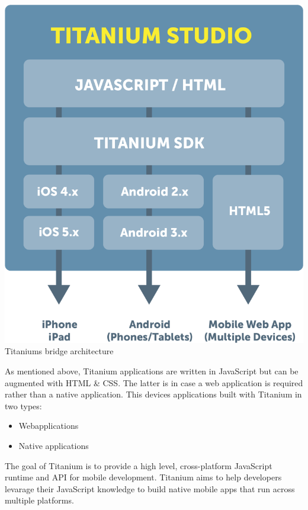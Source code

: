 \begin{centering}
	\includegraphics[scale=0.25]{images/titanium_architecture.png}\\{Titaniums bridge architecture\cite{Inc2012a}}\\
\end{centering}

As mentioned above, Titanium applications are written in JavaScript but can be augmented with HTML \& CSS. The latter is in case a web application is required rather than a native application. This devices applications built with Titanium in two types:
\begin{itemize}
	\item
	Webapplications
	\item
	Native applications
\end{itemize}

The goal of Titanium is to provide a high level, cross-platform JavaScript runtime and API for mobile development.\cite{Whinnery2012} Titanium aims to help developers levarage their JavaScript knowledge to build native mobile apps that run across multiple platforms.




